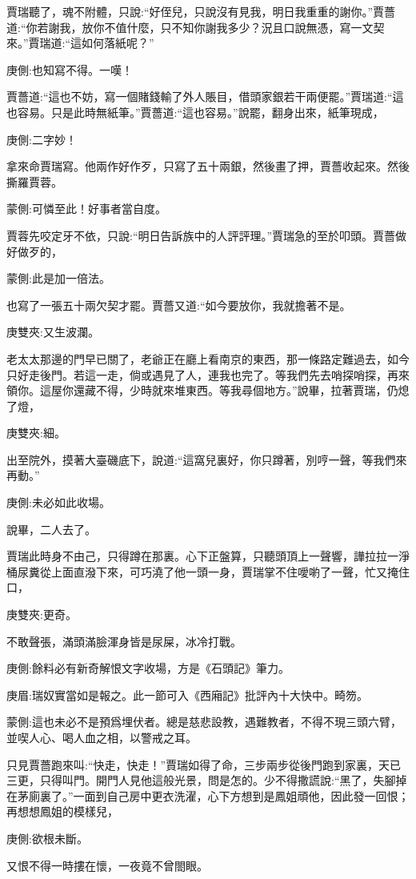 \begin{parag}
    賈瑞聽了，魂不附體，只說:“好侄兒，只說沒有見我，明日我重重的謝你。”賈薔道:“你若謝我，放你不值什麼，只不知你謝我多少？況且口說無憑，寫一文契來。”賈瑞道:“這如何落紙呢？”\begin{note}庚側:也知寫不得。一嘆！\end{note}賈薔道:“這也不妨，寫一個賭錢輸了外人賬目，借頭家銀若干兩便罷。”賈瑞道:“這也容易。只是此時無紙筆。”賈薔道:“這也容易。”說罷，翻身出來，紙筆現成，\begin{note}庚側:二字妙！\end{note}拿來命賈瑞寫。他兩作好作歹，只寫了五十兩銀，然後畫了押，賈薔收起來。然後撕羅賈蓉。\begin{note}蒙側:可憐至此！好事者當自度。\end{note}賈蓉先咬定牙不依，只說:“明日告訴族中的人評評理。”賈瑞急的至於叩頭。賈薔做好做歹的，\begin{note}蒙側:此是加一倍法。\end{note}也寫了一張五十兩欠契才罷。賈薔又道:“如今要放你，我就擔著不是。\begin{note}庚雙夾:又生波瀾。\end{note}老太太那邊的門早已關了，老爺正在廳上看南京的東西，那一條路定難過去，如今只好走後門。若這一走，倘或遇見了人，連我也完了。等我們先去哨探哨探，再來領你。這屋你還藏不得，少時就來堆東西。等我尋個地方。”說畢，拉著賈瑞，仍熄了燈，\begin{note}庚雙夾:細。\end{note}出至院外，摸著大臺磯底下，說道:“這窩兒裏好，你只蹲著，別哼一聲，等我們來再動。”\begin{note}庚側:未必如此收場。\end{note}說畢，二人去了。
\end{parag}


\begin{parag}
    賈瑞此時身不由己，只得蹲在那裏。心下正盤算，只聽頭頂上一聲響，譁拉拉一淨桶尿糞從上面直潑下來，可巧澆了他一頭一身，賈瑞掌不住噯喲了一聲，忙又掩住口，\begin{note}庚雙夾:更奇。\end{note}不敢聲張，滿頭滿臉渾身皆是尿屎，冰冷打戰。\begin{note}庚側:餘料必有新奇解恨文字收場，方是《石頭記》筆力。\end{note}\begin{note}庚眉:瑞奴實當如是報之。此一節可入《西廂記》批評內十大快中。畸笏。\end{note}\begin{note}蒙側:這也未必不是預爲埋伏者。總是慈悲設教，遇難教者，不得不現三頭六臂，並喫人心、喝人血之相，以警戒之耳。\end{note}只見賈薔跑來叫:“快走，快走！”賈瑞如得了命，三步兩步從後門跑到家裏，天已三更，只得叫門。開門人見他這般光景，問是怎的。少不得撒謊說:“黑了，失腳掉在茅廁裏了。”一面到自己房中更衣洗濯，心下方想到是鳳姐頑他，因此發一回恨；再想想鳳姐的模樣兒，\begin{note}庚側:欲根未斷。\end{note}又恨不得一時摟在懷，一夜竟不曾閤眼。
\end{parag}


